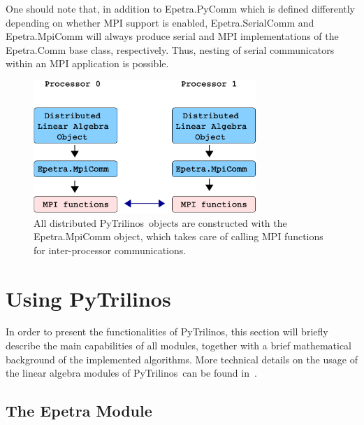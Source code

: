 \documentclass[acmtocl]{acmtrans2m}
\newcommand{\PyTrilinos}{{PyTrilinos}}
\begin{document}
One should note that, in addition to Epetra.PyComm which is defined
differently depending on whether MPI support is enabled,
Epetra.SerialComm and Epetra.MpiComm will always produce serial and
MPI implementations of the Epetra.Comm base class, respectively.
Thus, nesting of serial communicators within an MPI application is
possible.

\begin{figure}
  \begin{center}
    \includegraphics[height=5cm]{distributed_object}
    \caption{All distributed \PyTrilinos\ objects are constructed with
      the Epetra.MpiComm object, which takes care of calling MPI
      functions for inter-processor communications.}
    \label{fig:distributed}
  \end{center}
\end{figure}

\section{Using \PyTrilinos}
\label{sec:using}

In order to present the functionalities of \PyTrilinos, this section
will briefly describe the main capabilities of all modules, together
with a brief mathematical background of the implemented algorithms.
More technical details on the usage of the linear algebra modules of
\PyTrilinos\ can be found in~\cite{pytrilinos-la-guide}.

\subsection{The Epetra Module}
\label{subsec:epetra}
\end{document}
